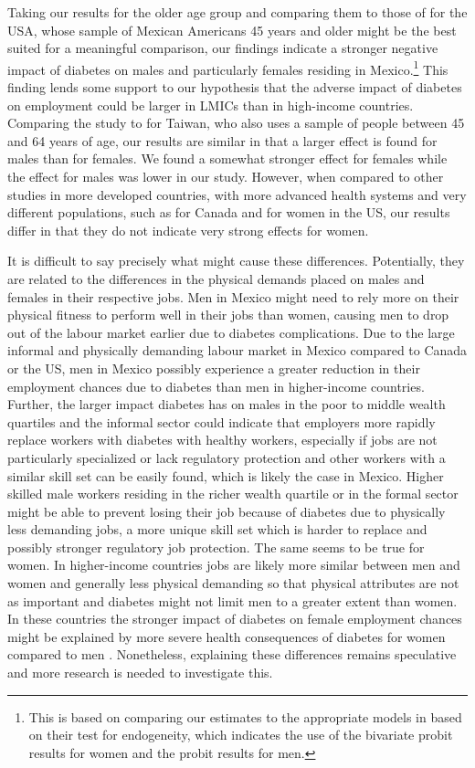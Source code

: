 Taking our results for the older age group and comparing
them to those of \textcite{Brown2005} for the USA, whose sample
of Mexican Americans 45 years and older might be the best suited for
a meaningful comparison, our findings indicate a stronger negative
impact of diabetes on males and particularly females residing in Mexico.\footnote{This is based on comparing our estimates to the appropriate
models in \textcite{Brown2005} based on their test for endogeneity,
which indicates the use of the bivariate probit results for women
and the probit results for men. } This finding lends some support to our hypothesis that the adverse
impact of diabetes on employment could be larger in \acp{LMIC} than
in high-income countries. Comparing the study to \textcite{Lin2011b}
for Taiwan, who also uses a sample of people between 45 and 64 years
of age, our results are similar in that a larger effect is found for
males than for females. We found a somewhat stronger effect for females
while the effect for males was lower in our study. However, when compared
to other studies in more developed countries, with more advanced health
systems and very different populations, such as \textcite{Latif2009}
for Canada and \textcite{Minor2010a} for women in the US, our results
differ in that they do not indicate very strong effects for women. 

It is difficult to say precisely what might cause these
differences. Potentially, they are related to the differences in the
physical demands placed on males and females in their respective jobs.
Men in Mexico might need to rely more on their physical fitness to
perform well in their jobs than women, causing men to drop out of
the labour market earlier due to diabetes complications. Due to the
large informal and physically demanding labour market in Mexico compared
to Canada or the US, men in Mexico possibly experience a greater reduction
in their employment chances due to diabetes than men in higher-income
countries. Further, the larger impact diabetes has on males in the
poor to middle wealth quartiles and the informal sector could indicate
that employers more rapidly replace workers with diabetes with healthy
workers, especially if jobs are not particularly specialized or lack
regulatory protection and other workers with a similar skill set can
be easily found, which is likely the case in Mexico. Higher skilled
male workers residing in the richer wealth quartile or in the formal
sector might be able to prevent losing their job because of diabetes
due to physically less demanding jobs,  a more unique skill set which
is harder to replace and possibly stronger regulatory job protection.
The same seems to be true for women. In higher-income countries jobs
are likely more similar between men and women and generally less physical
demanding so that physical attributes are not as important and diabetes
might not limit men to a greater extent than women. In these countries
the stronger impact of diabetes on female employment chances might
be explained by more severe health consequences of diabetes for women
compared to men \parencite{Huxley2006}. Nonetheless, explaining these
differences remains speculative and more research is needed to investigate
this.

